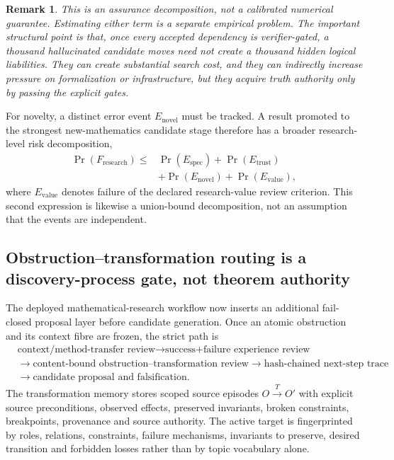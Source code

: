 \documentclass[11pt]{article}
\newtheorem{remark}{Remark}
\begin{document}
\begin{remark}
This is an assurance decomposition, not a calibrated numerical guarantee. Estimating either term is a separate empirical problem. The important structural point is that, once every accepted dependency is verifier-gated, a thousand hallucinated candidate moves need not create a thousand hidden logical liabilities. They can create substantial search cost, and they can indirectly increase pressure on formalization or infrastructure, but they acquire truth authority only by passing the explicit gates.
\end{remark}

For novelty, a distinct error event $E_{\mathrm{novel}}$ must be tracked. A result promoted to the strongest new-mathematics candidate stage therefore has a broader research-level risk decomposition,
\[
\begin{aligned}
\Pr(F_{\mathrm{research}})\leq{}&\Pr(E_{\mathrm{spec}})
+\Pr(E_{\mathrm{trust}})\\
&+\Pr(E_{\mathrm{novel}})
+\Pr(E_{\mathrm{value}}),
\end{aligned}
\]
where $E_{\mathrm{value}}$ denotes failure of the declared research-value review criterion. This second expression is likewise a union-bound decomposition, not an assumption that the events are independent.

\subsection{Obstruction--transformation routing is a discovery-process gate, not theorem authority}

The deployed mathematical-research workflow now inserts an additional fail-closed proposal layer before candidate generation. Once an atomic obstruction and its context fibre are frozen, the strict path is
\[
\begin{aligned}
&\text{context/method-transfer review}
\rightarrow \text{success+failure experience review}\\
&\rightarrow \text{content-bound obstruction--transformation review}
\rightarrow \text{hash-chained next-step trace}\\
&\rightarrow \text{candidate proposal and falsification}.
\end{aligned}
\]
The transformation memory stores scoped source episodes $O\xrightarrow{T}O'$ with explicit source preconditions, observed effects, preserved invariants, broken constraints, breakpoints, provenance and source authority. The active target is fingerprinted by roles, relations, constraints, failure mechanisms, invariants to preserve, desired transition and forbidden losses rather than by topic vocabulary alone.
\end{document}
